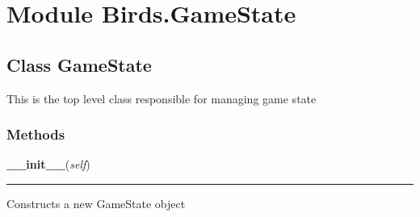 %
%
%


\section{Module Birds.GameState}

    \label{Birds:GameState}


\subsection{Class GameState}

    \label{Birds:GameState:GameState}
This is the top level class responsible for managing game state



  \subsubsection{Methods}

    \label{Birds:GameState:GameState:__init__}

    \vspace{0.5ex}

\hspace{.8\funcindent}\begin{boxedminipage}{\funcwidth}

    \raggedright \textbf{\_\_init\_\_}(\textit{self})

    \vspace{-1.5ex}

    \rule{\textwidth}{0.5\fboxrule}
\setlength{\parskip}{2ex}
    Constructs a new GameState object

\setlength{\parskip}{1ex}
    \end{boxedminipage}

